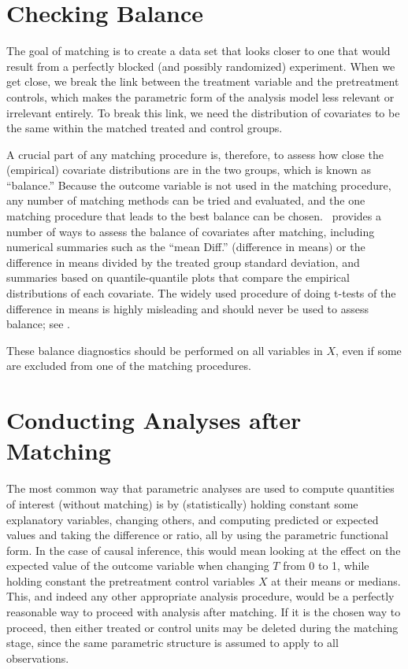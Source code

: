 \section{Checking Balance}
\label{sec:balance-sum}

The goal of matching is to create a data set that looks closer to one
that would result from a perfectly blocked (and possibly randomized)
experiment.  When we get close, we break the link between the treatment
variable and the pretreatment controls, which makes the parametric
form of the analysis model less relevant or irrelevant entirely.  To
break this link, we need the distribution of covariates to be the same
within the matched treated and control groups.

A crucial part of any matching procedure is, therefore, to assess how
close the (empirical) covariate distributions are in the two groups,
which is known as ``balance.''  Because the outcome variable is not
used in the matching procedure, any number of matching methods can be
tried and evaluated, and the one matching procedure that leads to the
best balance can be chosen.  \MatchIt\ provides a number of ways to
assess the balance of covariates after matching, including numerical
summaries such as the ``mean Diff.'' (difference in means) or the
difference in means divided by the treated group standard deviation,
and summaries based on quantile-quantile plots that compare the
empirical distributions of each covariate.  The widely used procedure
of doing t-tests of the difference in means is highly misleading and
should never be used to assess balance; see \citet{ImaKinStu07}.

These balance diagnostics should be performed on all variables in $X$,
even if some are excluded from one of the matching procedures.

\section{Conducting Analyses after Matching}\label{s:qoi}

The most common way that parametric analyses are used to compute
quantities of interest (without matching) is by (statistically)
holding constant some explanatory variables, changing others, and
computing predicted or expected values and taking the difference or
ratio, all by using the parametric functional form.  In the case of
causal inference, this would mean looking at the effect on the
expected value of the outcome variable when changing $T$ from 0 to 1,
while holding constant the pretreatment control variables $X$ at their
means or medians.  This, and indeed any other appropriate analysis
procedure, would be a perfectly reasonable way to proceed with
analysis after matching.  If it is the chosen way to proceed, then
either treated or control units may be deleted during the matching
stage, since the same parametric structure is assumed to apply to all
observations.

